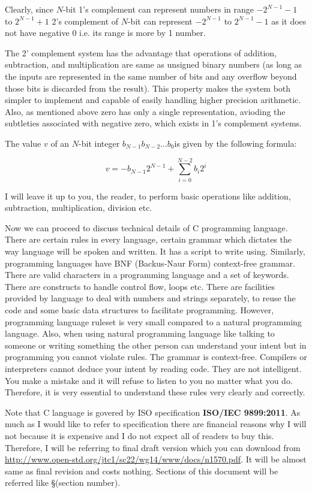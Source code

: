 Clearly, since $N$-bit 1's complement can represent numbers in range
$-2^{N-1}-1$ to $2^{N-1} + 1$ 2's complement of $N$-bit can represent
$-2^{N-1}$ to $2^{N-1} - 1$ as it does not have negative 0 i.e. its range is
more by 1 number.

The 2' complement system has the advantage that operations of addition,
subtraction, and multiplication are same as unsigned binary numbers (as long as
the inputs are represented in the same number of bits and any overflow beyond
those bits is discarded from the result). This property makes the system both
simpler to implement and capable of easily handling higher precision
arithmetic. Also, as mentioned above zero has only a single 
representation, avioding the subtleties associated with negative zero, which
exists in 1's complement systems.

The value $v$ of an $N$-bit integer $b_{N-1} b_{N-2} \dots b_0 $is given by the
following formula:

\begin{equation}
v=-b_{N-1} 2^{N-1} + \sum_{i=0}^{N-2} b_i 2^i
\end{equation}

I will leave it up to you, the reader, to perform basic operations like
addition, subtraction, multiplication, division etc.

Now we can proceed to discuss technical details of C programming
language. There are certain rules in every language, certain grammar which
dictates the
way language will be spoken and written. It has a script to write
using. Similarly, programming languages have BNF (Backus-Naur Form)
context-free grammar. There are valid characters in a programming language and
a set of keywords. There are constructs to handle control flow, loops
etc. There are facilities provided by language to deal with numbers and strings
separately, to reuse the code and some basic data structures to facilitate
programming. However, programming language ruleset is very small compared
to a natural programming language. Also, when using natural programming
language like talking to someone or writing something the other person can
understand your intent but in programming you cannot violate rules. The grammar
is context-free. Compilers or interpreters cannot deduce your intent by reading
code. They are not intelligent. You make a mistake and it will refuse to listen
to you no matter what you do. Therefore, it is very essential to understand
these rules very clearly and correctly.

Note that C language is govered by ISO specification \textbf{ISO/IEC
  9899:2011}. As much as I would like to refer to specification there are
financial reasons why I will not because it is expensive and I do not expect
all of readers to buy this. Therefore, I will be referring to final draft
version which you can download from
\url{http://www.open-std.org/jtc1/sc22/wg14/www/docs/n1570.pdf}. It will be
almost same as final revision and costs nothing. Sections of this document will
be referred like \S(section number).

